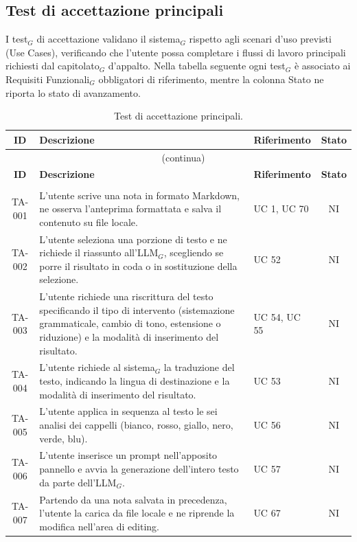 \documentclass[a4paper, 10pt, colorlinks=true, linkcolor=black, urlcolor=blue, citecolor=blue, hidelinks]{article}
\begin{document}
\endgroup
\subsection{Test di accettazione principali}
I test$_G$ di accettazione validano il sistema$_G$ rispetto agli scenari d'uso previsti (Use Cases), verificando che l'utente possa completare i flussi di lavoro principali richiesti dal capitolato$_G$ d'appalto. Nella tabella seguente ogni test$_G$ è associato ai Requisiti Funzionali$_G$ obbligatori di riferimento, mentre la colonna Stato ne riporta lo stato di avanzamento.
\begingroup
\small
\renewcommand{\arraystretch}{1.25}
\begin{longtable}{|c|p{8.5cm}|>{\raggedright\arraybackslash}p{2.5cm}|c|}
\hline
\textbf{ID} & \textbf{Descrizione} & \textbf{Riferimento} & \textbf{Stato} \\
\hline
\endfirsthead
\multicolumn{4}{c}{\tablename~\thetable{}~(continua)}\\
\hline
\textbf{ID} & \textbf{Descrizione} & \textbf{Riferimento} & \textbf{Stato} \\
\hline
\endhead
\endfoot
\caption{Test di accettazione principali.}\label{tab:test-accettazione-principali}\\
\endlastfoot
TA-001 & L'utente scrive una nota in formato Markdown, ne osserva l'anteprima formattata e salva il contenuto su file locale. & UC 1, UC 70 & NI \\ \hline
TA-002 & L'utente seleziona una porzione di testo e ne richiede il riassunto all'LLM$_G$, scegliendo se porre il risultato in coda o in sostituzione della selezione. & UC 52 & NI \\ \hline
TA-003 & L'utente richiede una riscrittura del testo specificando il tipo di intervento (sistemazione grammaticale, cambio di tono, estensione o riduzione) e la modalità di inserimento del risultato. & UC 54, UC 55 & NI \\ \hline
TA-004 & L'utente richiede al sistema$_G$ la traduzione del testo, indicando la lingua di destinazione e la modalità di inserimento del risultato. & UC 53 & NI \\ \hline
TA-005 & L'utente applica in sequenza al testo le sei analisi dei cappelli (bianco, rosso, giallo, nero, verde, blu). & UC 56 & NI \\ \hline
TA-006 & L'utente inserisce un prompt nell'apposito pannello e avvia la generazione dell'intero testo da parte dell'LLM$_G$. & UC 57 & NI \\ \hline
TA-007 & Partendo da una nota salvata in precedenza, l'utente la carica da file locale e ne riprende la modifica nell'area di editing. & UC 67 & NI \\ \hline
\end{longtable}
\endgroup
\end{document}
